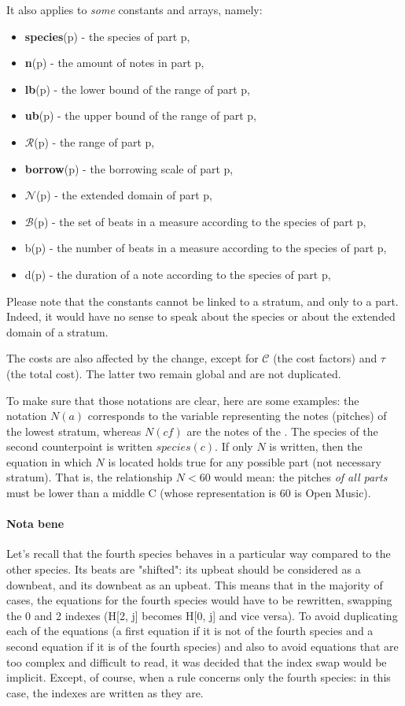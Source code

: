 \noindent It also applies to \textit{some} constants and arrays, namely:
\begin{itemize}
    \item \textbf{species}(p) - the species of part p,
    \item \textbf{n}(p) - the amount of notes in part p,
    \item \textbf{lb}(p) - the lower bound of the range of part p,
    \item \textbf{ub}(p) - the upper bound of the range of part p,
    \item $\mathcal{R}$(p) - the range of part p,
    \item \textbf{borrow}(p) - the borrowing scale of part p,
    \item $\mathcal{N}$(p) - the extended domain of part p,
    \item $\mathcal{B}$(p) - the set of beats in a measure according to the species of part p,
    \item b(p) - the number of beats in a measure according to the species of part p,
    \item d(p) - the duration of a note according to the species of part p,
\end{itemize}
Please note that the constants cannot be linked to a stratum, and only to a part. Indeed, it would have no sense to speak about the species or about the extended domain of a stratum.

The costs are also affected by the change, except for $\mathcal{C}$ (the cost factors) and $\tau$ (the total cost). The latter two remain global and are not duplicated.


To make sure that those notations are clear, here are some examples: the notation $N(a)$ corresponds to the variable representing the notes (pitches) of the lowest stratum, whereas $N(cf)$ are the notes of the \cf. The species of the second counterpoint is written $species(c)$. If only $N$ is written, then the equation in which $N$ is located holds true for any possible part (not necessary stratum). That is, the relationship $N < 60$ would mean: the pitches \textit{of all parts} must be lower than a middle C (whose representation is 60 is Open Music).

\paragraph{Nota bene} Let's recall that the fourth species behaves in a particular way compared to the other species. Its beats are "shifted": its upbeat should be considered as a downbeat, and its downbeat as an upbeat. This means that in the majority of cases, the equations for the fourth species would have to be rewritten, swapping the 0 and 2 indexes (H[2, j] becomes H[0, j] and vice versa). To avoid duplicating each of the equations (a first equation if it is not of the fourth species and a second equation if it is of the fourth species) and also to avoid equations that are too complex and difficult to read, it was decided that the index swap would be implicit. Except, of course, when a rule concerns only the fourth species: in this case, the indexes are written as they are.

